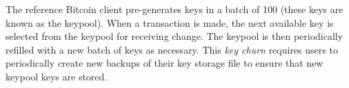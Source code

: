 The reference Bitcoin client pre-generates keys in a batch of 100 (these keys are known as the keypool). When a transaction is made, the next available key is selected from the keypool for receiving change. The keypool is then periodically refilled with a new batch of keys as necessary. This \emph{key churn} requires users to periodically create new backups of their key storage file to ensure that new keypool keys are stored. 





